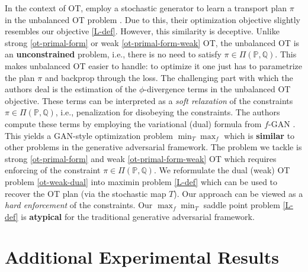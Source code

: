 \documentclass{article} %
\begin{document}
In the context of OT, \citep{yang2018scalable} employ a stochastic generator to learn a transport plan $\pi$ in the unbalanced OT problem \citep{chizat2017unbalanced}. Due to this, their optimization objective slightly resembles our objective \eqref{L-def}. However, this similarity is deceptive. Unlike strong \eqref{ot-primal-form} or weak \eqref{ot-primal-form-weak} OT, the unbalanced OT is an \textbf{unconstrained} problem, i.e., there is no need to satisfy $\pi\in\Pi(\mathbb{P},\mathbb{Q})$. This makes unbalanced OT easier to handle: to optimize it one just has to parametrize the plan $\pi$ and backprop through the loss. The challenging part with which the authors deal is the estimation of the $\phi$-divergence terms in the unbalanced OT objective. These terms can be interpreted as a \textit{soft relaxation} of the constraints $\pi\in\Pi(\mathbb{P},\mathbb{Q})$, i.e., penalization for disobeying the constraints. The authors compute these terms by employing the variational (dual) formula from $f$-GAN \citep{nowozin2016f}. This yields a GAN-style optimization problem $\min_{T}\max_{f}$ which is \textbf{similar} to other problems in the generative adversarial framework. The problem we tackle is strong \eqref{ot-primal-form} and weak \eqref{ot-primal-form-weak} OT
which requires enforcing of the constraint $\pi\in\Pi(\mathbb{P},\mathbb{Q})$. We reformulate the dual (weak) OT problem \eqref{ot-weak-dual} into maximin problem \eqref{L-def} which can be used to recover the OT plan (via the stochastic map $T$). Our approach can be viewed as a \textit{hard enforcement} of the constraints. Our $\max_{f}\min_{T}$ saddle point problem \eqref{L-def} is \textbf{atypical} for the traditional generative adversarial framework. 

\clearpage
\section{Additional Experimental Results}
\label{sec-additional-exp-results}
\end{document}
